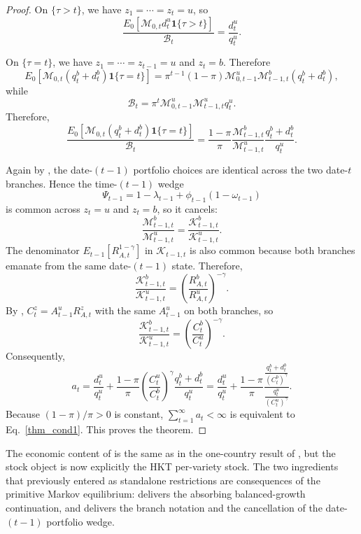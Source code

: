 \documentclass{article}
\begin{document}
\begin{proof}
On $\{\tau>t\}$, we have $z_1=\cdots=z_t=u$, so
\[
\frac{
E_0\!\left[\mathcal M_{0,t}d_t^u\mathbf 1\{\tau>t\}\right]
}{
\mathcal B_t
}
=
\frac{d_t^u}{q_t^u}.
\]

On $\{\tau=t\}$, we have $z_1=\cdots=z_{t-1}=u$ and $z_t=b$. Therefore
\[
E_0\!\left[\mathcal M_{0,t}(q_t^b+d_t^b)\mathbf 1\{\tau=t\}\right]
=
\pi^{t-1}(1-\pi)\mathcal M_{0,t-1}^u\mathcal M_{t-1,t}^b(q_t^b+d_t^b),
\]
while
\[
\mathcal B_t
=
\pi^t\mathcal M_{0,t-1}^u\mathcal M_{t-1,t}^u q_t^u.
\]
Therefore,
\[
\frac{
E_0\!\left[\mathcal M_{0,t}(q_t^b+d_t^b)\mathbf 1\{\tau=t\}\right]
}{
\mathcal B_t
}
=
\frac{1-\pi}{\pi}
\frac{\mathcal M_{t-1,t}^b}{\mathcal M_{t-1,t}^u}
\frac{q_t^b+d_t^b}{q_t^u}.
\]

Again by , the date-$(t-1)$ portfolio choices are identical across the two date-$t$ branches. Hence the time-$(t-1)$ wedge
\[
\Psi_{t-1}=1-\lambda_{t-1}+\phi_{t-1}(1-\omega_{t-1})
\]
is common across $z_t=u$ and $z_t=b$, so it cancels:
\[
\frac{\mathcal M_{t-1,t}^b}{\mathcal M_{t-1,t}^u}
=
\frac{\mathcal K_{t-1,t}^b}{\mathcal K_{t-1,t}^u}.
\]
The denominator $E_{t-1}[R_{A,t}^{1-\gamma}]$ in $\mathcal K_{t-1,t}$ is also common because both branches emanate from the same date-$(t-1)$ state. Therefore,
\[
\frac{\mathcal K_{t-1,t}^b}{\mathcal K_{t-1,t}^u}
=
\left(\frac{R_{A,t}^b}{R_{A,t}^u}\right)^{-\gamma}.
\]
By , $C_t^z=A_{t-1}^uR_{A,t}^z$ with the same $A_{t-1}^u$ on both branches, so
\[
\frac{\mathcal K_{t-1,t}^b}{\mathcal K_{t-1,t}^u}
=
\left(\frac{C_t^b}{C_t^u}\right)^{-\gamma}.
\]
Consequently,
\[
a_t
=
\frac{d_t^u}{q_t^u}
+
\frac{1-\pi}{\pi}
\left(\frac{C_t^u}{C_t^b}\right)^\gamma
\frac{q_t^b+d_t^b}{q_t^u}
=
\frac{d_t^u}{q_t^u}
+
\frac{1-\pi}{\pi}
\frac{\frac{q_t^b+d_t^b}{(C_t^b)^\gamma}}{\frac{q_t^u}{(C_t^u)^\gamma}}.
\]
Because $(1-\pi)/\pi>0$ is constant, $\sum_{t=1}^\infty a_t<\infty$ is equivalent to Eq.~\eqref{thm_cond1}. This proves the theorem.
\end{proof}

The economic content of  is the same as in the one-country result of \citet{hirano2025technological}, but the stock object is now explicitly the HKT per-variety stock. The two ingredients that previously entered as standalone restrictions are consequences of the primitive Markov equilibrium:  delivers the absorbing balanced-growth continuation, and  delivers the branch notation and the cancellation of the date-$(t-1)$ portfolio wedge.
\end{document}

